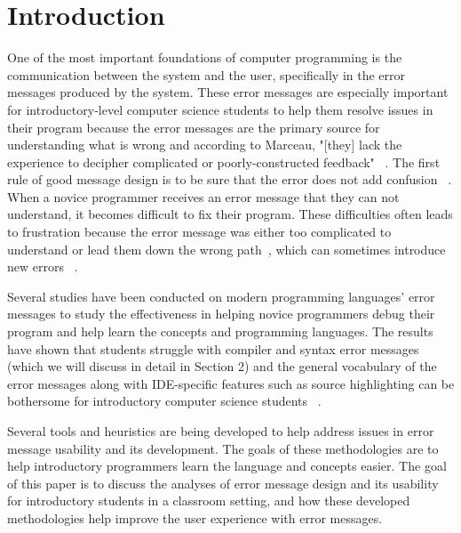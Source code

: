 \documentclass{sig-alternate}
\begin{document}


\section{Introduction}\label{intro}
One of the most important foundations of computer programming is the communication between the system and the user, specifically in the error messages produced by the system. These error messages are especially important for introductory-level computer science students to help them resolve issues in their program because the error messages are the primary source for understanding what is wrong and according to Marceau, "[they] lack the experience to decipher complicated or poorly-constructed feedback" ~\cite{Marceau:2011:MEE:1953163.1953308}. The first rule of good message design is to be sure that the error does not add confusion ~\cite{Isa:1983:MOE:800045.801583}. When a novice programmer receives an error message that they can not understand, it becomes difficult to fix their program. These difficulties often leads to frustration because the error message was either too complicated to understand or lead them down the wrong path~\cite{Marceau:2011:MYL:2048237.2048241}, which can sometimes introduce new errors ~\cite{Denny:2014:ESE:2591708.2591748}. 

Several studies have been conducted on modern programming languages' error messages to study the effectiveness in helping novice programmers debug their program and help learn the concepts and programming languages. The results have shown that students struggle with compiler and syntax error messages ~\cite{Denny:2014:ESE:2591708.2591748} ~\cite{Traver:2010} (which we will discuss in detail in Section 2) and the general vocabulary of the error messages along with IDE-specific features such as source highlighting can be bothersome for introductory computer science students ~\cite{Marceau:2011:MYL:2048237.2048241}. 

Several tools and heuristics are being developed to help address issues in error message usability and its development. The goals of these methodologies are to help introductory programmers learn the language and concepts easier. The goal of this paper is to discuss the analyses of error message design and its usability for introductory students in a classroom setting, and how these developed methodologies help improve the user experience with error messages. 
\end{document}

